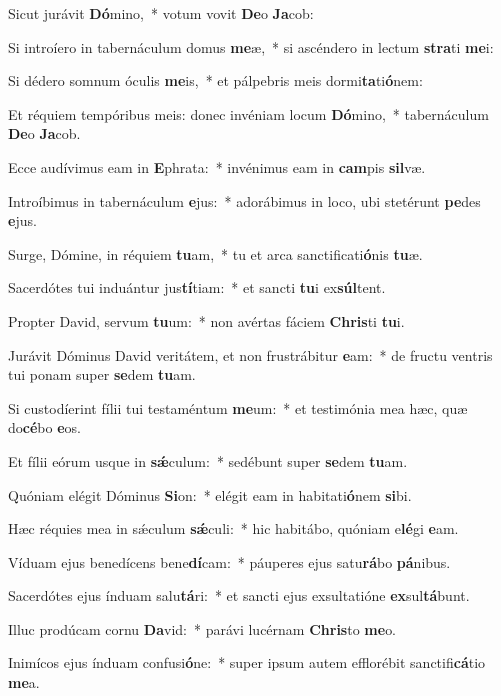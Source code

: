 \item Sicut jurávit \textbf{Dó}mino,~* votum vovit \textbf{De}o \textbf{Ja}cob:
\item Si introíero in tabernáculum domus \textbf{me}æ,~* si ascéndero in lectum \textbf{stra}ti \textbf{me}i:
\item Si dédero somnum óculis \textbf{me}is,~* et pálpebris meis dormi\textbf{ta}ti\textbf{ó}nem:
\item Et réquiem tempóribus meis: donec invéniam locum \textbf{Dó}mino,~* tabernáculum \textbf{De}o \textbf{Ja}cob.
\item Ecce audívimus eam in \textbf{E}phrata:~* invénimus eam in \textbf{cam}pis \textbf{sil}væ.
\item Introíbimus in tabernáculum \textbf{e}jus:~* adorábimus in loco, ubi stetérunt \textbf{pe}des \textbf{e}jus.
\item Surge, Dómine, in réquiem \textbf{tu}am,~* tu et arca sanctificati\textbf{ó}nis \textbf{tu}æ.
\item Sacerdótes tui induántur jus\textbf{tí}tiam:~* et sancti \textbf{tu}i ex\textbf{súl}tent.
\item Propter David, servum \textbf{tu}um:~* non avértas fáciem \textbf{Chris}ti \textbf{tu}i.
\item Jurávit Dóminus David veritátem, et non frustrábitur \textbf{e}am:~* de fructu ventris tui ponam super \textbf{se}dem \textbf{tu}am.
\item Si custodíerint fílii tui testaméntum \textbf{me}um:~* et testimónia mea hæc, quæ do\textbf{cé}bo \textbf{e}os.
\item Et fílii eórum usque in \textbf{sǽ}culum:~* sedébunt super \textbf{se}dem \textbf{tu}am.
\item Quóniam elégit Dóminus \textbf{Si}on:~* elégit eam in habitati\textbf{ó}nem \textbf{si}bi.
\item Hæc réquies mea in sǽculum \textbf{sǽ}culi:~* hic habitábo, quóniam e\textbf{lé}gi \textbf{e}am.
\item Víduam ejus benedícens bene\textbf{dí}cam:~* páuperes ejus satu\textbf{rá}bo \textbf{pá}nibus.
\item Sacerdótes ejus índuam salu\textbf{tá}ri:~* et sancti ejus exsultatióne \textbf{ex}sul\textbf{tá}bunt.
\item Illuc prodúcam cornu \textbf{Da}vid:~* parávi lucérnam \textbf{Chris}to \textbf{me}o.
\item Inimícos ejus índuam confusi\textbf{ó}ne:~* super ipsum autem efflorébit sanctifi\textbf{cá}tio \textbf{me}a.
